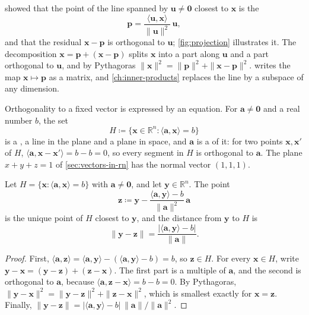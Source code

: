  showed that the point of the line spanned by $\mathbf u\ne\mathbf 0$ closest to $\mathbf x$ is the 
\[
\mathbf p=\frac{\langle\mathbf u,\mathbf x\rangle}{\|\mathbf u\|^2}\,\mathbf u ,
\]
and that the residual $\mathbf x-\mathbf p$ is orthogonal to $\mathbf u$; \cref{fig:projection} illustrates it. The decomposition $\mathbf x=\mathbf p+(\mathbf x-\mathbf p)$ splits $\mathbf x$ into a part along $\mathbf u$ and a part orthogonal to $\mathbf u$, and by Pythagoras $\|\mathbf x\|^2=\|\mathbf p\|^2+\|\mathbf x-\mathbf p\|^2$.  writes the map $\mathbf x\mapsto\mathbf p$ as a matrix, and \cref{ch:inner-products} replaces the line by a subspace of any dimension.

Orthogonality to a fixed vector is expressed by an equation. For $\mathbf a\ne\mathbf 0$ and a real number $b$, the set
\[
H\coloneqq\{\mathbf x\in\mathbb R^n: \langle\mathbf a,\mathbf x\rangle=b\}
\]
is a , a line in the plane and a plane in space, and $\mathbf a$ is a  of it: for two points $\mathbf x,\mathbf x'$ of $H$, $\langle\mathbf a,\mathbf x-\mathbf x'\rangle=b-b=0$, so every segment in $H$ is orthogonal to $\mathbf a$. The plane $x+y+z=1$ of \cref{sec:vectors-in-rn} has the normal vector $(1,1,1)$.

\begin{proposition}
\label{prop:hyperplane-distance}
Let $H=\{\mathbf x: \langle\mathbf a,\mathbf x\rangle=b\}$ with $\mathbf a\ne\mathbf 0$, and let $\mathbf y\in\mathbb R^n$. The point
\[
\mathbf z\coloneqq\mathbf y-\frac{\langle\mathbf a,\mathbf y\rangle-b}{\|\mathbf a\|^2}\,\mathbf a
\]
is the unique point of $H$ closest to $\mathbf y$, and the distance from $\mathbf y$ to $H$ is
\[
\|\mathbf y-\mathbf z\|=\frac{|\langle\mathbf a,\mathbf y\rangle-b|}{\|\mathbf a\|}.
\]
\end{proposition}

\begin{proof}
First, $\langle\mathbf a,\mathbf z\rangle=\langle\mathbf a,\mathbf y\rangle-(\langle\mathbf a,\mathbf y\rangle-b)=b$, so $\mathbf z\in H$. For every $\mathbf x\in H$, write $\mathbf y-\mathbf x=(\mathbf y-\mathbf z)+(\mathbf z-\mathbf x)$. The first part is a multiple of $\mathbf a$, and the second is orthogonal to $\mathbf a$, because $\langle\mathbf a,\mathbf z-\mathbf x\rangle=b-b=0$. By Pythagoras, $\|\mathbf y-\mathbf x\|^2=\|\mathbf y-\mathbf z\|^2+\|\mathbf z-\mathbf x\|^2$, which is smallest exactly for $\mathbf x=\mathbf z$. Finally, $\|\mathbf y-\mathbf z\|=|\langle\mathbf a,\mathbf y\rangle-b|\,\|\mathbf a\|/\|\mathbf a\|^2$.
\end{proof}

